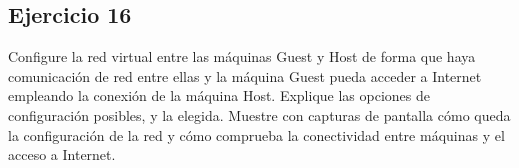 \documentclass[a4paper, 11pt]{article} %
\begin{document}
\subsection*{Ejercicio 16}
Configure la red virtual entre las máquinas Guest y Host de forma que
haya comunicación de red entre ellas y la máquina Guest pueda acceder a Internet
empleando la conexión de la máquina Host. Explique las opciones de configuración
posibles, y la elegida. Muestre con capturas de pantalla cómo queda la configuración
de la red y cómo comprueba la conectividad entre máquinas y el acceso a Internet.
\end{document}
